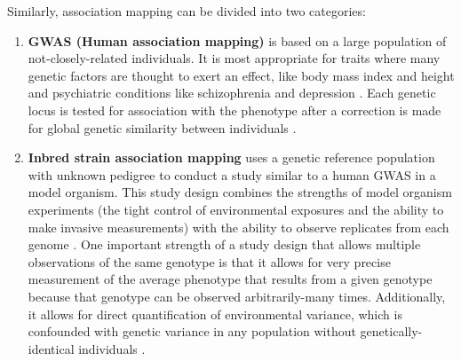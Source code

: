 Similarly, association mapping can be divided into two categories:
\begin{enumerate}
	\item \textbf{GWAS (Human association mapping)} is based on a large population of not-closely-related individuals.
	It is most appropriate for traits where many genetic factors are thought to exert an effect, like body mass index \citep{Speliotes2010,Locke2015} and height \citep{Allen2010,Wood2014-fh} and psychiatric conditions like schizophrenia \citep{Ripke2014a} and depression \citep{PGC2017}.
	Each genetic locus is tested for association with the phenotype after a correction is made for global genetic similarity between individuals \citep{Lippert2011,Zhou2012}.
	\item \textbf{Inbred strain association mapping} uses a genetic reference population with unknown pedigree to conduct a study similar to a human GWAS in a model organism.
	This study design combines the strengths of model organism experiments (the tight control of environmental exposures and the ability to make invasive measurements) with the ability to observe replicates from each genome \citep{Payseur2007a,Kang2008,Kirby2010a}.
	One important strength of a study design that allows multiple observations of the same genotype is that it allows for very precise measurement of the average phenotype that results from a given genotype because that genotype can be observed arbitrarily-many times.
	Additionally, it allows for direct quantification of environmental variance, which is confounded with genetic variance in any population without genetically-identical individuals \citep{Falconer1965,Lynch1998}.


\end{enumerate}

